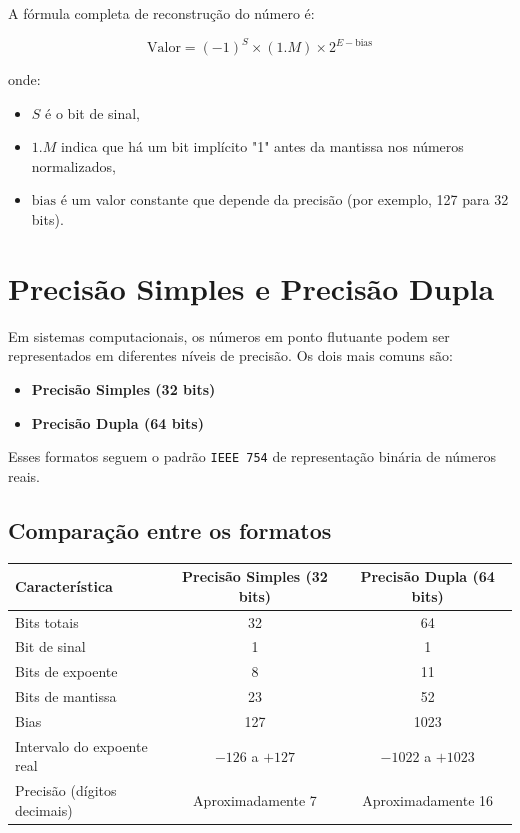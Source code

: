 A fórmula completa de reconstrução do número é:

\[
\text{Valor} = (-1)^S \times (1.M) \times 2^{E - \text{bias}}
\]

onde:

\begin{itemize}
  \item \( S \) é o bit de sinal,
  \item \( 1.M \) indica que há um bit implícito "1" antes da mantissa nos números normalizados,
  \item \( \text{bias} \) é um valor constante que depende da precisão (por exemplo, 127 para 32 bits).
\end{itemize}

\section*{Precisão Simples e Precisão Dupla}

Em sistemas computacionais, os números em ponto flutuante podem ser representados em diferentes níveis de precisão. Os dois mais comuns são:

\begin{itemize}
  \item \textbf{Precisão Simples (32 bits)}
  \item \textbf{Precisão Dupla (64 bits)}
\end{itemize}

Esses formatos seguem o padrão \texttt{IEEE 754} de representação binária de números reais.

\subsection*{Comparação entre os formatos}

\begin{center}
\begin{tabular}{|l|c|c|}
\hline
\textbf{Característica} & \textbf{Precisão Simples (32 bits)} & \textbf{Precisão Dupla (64 bits)} \\
\hline
Bits totais & 32 & 64 \\
\hline
Bit de sinal & 1 & 1 \\
\hline
Bits de expoente & 8 & 11 \\
\hline
Bits de mantissa & 23 & 52 \\
\hline
Bias & 127 & 1023 \\
\hline
Intervalo do expoente real & \(-126\) a \(+127\) & \(-1022\) a \(+1023\) \\
\hline
Precisão (dígitos decimais) & Aproximadamente 7 & Aproximadamente 16 \\
\hline
\end{tabular}
\end{center}

